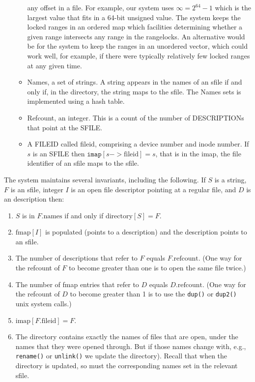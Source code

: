 \documentclass[10pt]{article}
\begin{document}
\begin{itemize}
\begin{itemize}
     any offset in a file.  For example, our system uses
     $\infty=2^{64}-1$ which is the largest value that fits in a
     64-bit unsigned value.  The system keeps the locked ranges in an
     ordered map which facilities determining whether a given range
     intersects any range in the rangelocks.  An alternative would be
     for the system to keep the ranges in an unordered vector, which
     could work well, for example, if there were typically relatively
     few locked ranges at any given time.
   \item Names, a set of strings.  A string appears in the names of an
     sfile if and only if, in the directory, the string maps to the
     sfile.  The Names sets is implemented using a hash table.
   \item Refcount, an integer.  This is a count of the number of DESCRIPTIONs that point at the SFILE\@.
   \item A FILEID called fileid, comprising a device number and inode
     number.  If $s$ is an SFILE then
     $\texttt{imap}[s->\mbox{fileid}]=s$, that is in the imap, the file
     identifier of an sfile maps to the sfile.
 \end{itemize}
\end{itemize}

The system maintains several invariants, including the following.  If
$S$ is a string, $F$ is an sfile, integer $I$ is an open file
descriptor pointing at a regular file, and $D$ is an description then:
\begin{enumerate}
\item  $S$ is in $F.\mbox{names}$ if and only if $\mbox{directory}[S]=F$.
\item  $\mbox{fmap}[I]$ is populated (points to a description) and the
description points to an sfile.
\item The number of descriptions that refer to $F$ equals
  $F.\mbox{refcount}$.  (One way for the refcount of $F$ to become
  greater than one is to open the same file twice.)
\item The number of fmap entries that refer to $D$ equals
  $D.\mbox{refcount}$.  (One way for the refcount of $D$ to become
  greater than 1 is to use the \texttt{dup()} or \texttt{dup2()} unix
  system calls.)
\item $\mbox{imap}[F.\mbox{fileid}] = F$.
\item The directory contains exactly the names of files that are open,
  under the names that they were opened through.  But if those names
  change with, e.g., \texttt{rename()} or \texttt{unlink()} we update
  the directory). Recall that when the directory is updated, so must
  the corresponding names set in the relevant sfile.
\end{enumerate}
\end{document}
